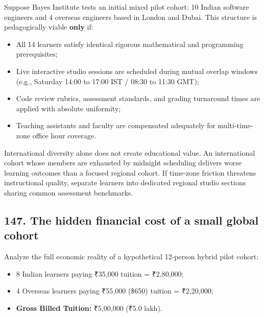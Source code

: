 Suppose Bayes Institute tests an initial mixed pilot cohort: 10 Indian software engineers and 4 overseas engineers based in London and Dubai. This structure is pedagogically viable \textbf{only} if:
\begin{itemize}
    \item All 14 learners satisfy identical rigorous mathematical and programming prerequisites;
    \item Live interactive studio sessions are scheduled during mutual overlap windows (e.g., Saturday 14:00 to 17:00 IST / 08:30 to 11:30 GMT);
    \item Code review rubrics, assessment standards, and grading turnaround times are applied with absolute uniformity;
    \item Teaching assistants and faculty are compensated adequately for multi-time-zone office hour coverage.
\end{itemize}
International diversity alone does not create educational value. An international cohort whose members are exhausted by midnight scheduling delivers worse learning outcomes than a focused regional cohort. If time-zone friction threatens instructional quality, separate learners into dedicated regional studio sections sharing common assessment benchmarks.

\subsection{147. The hidden financial cost of a small global cohort}

Analyze the full economic reality of a hypothetical 12-person hybrid pilot cohort:
\begin{itemize}
    \item 8 Indian learners paying ₹35,000 tuition = ₹2,80,000;
    \item 4 Overseas learners paying ₹55,000 (\$650) tuition = ₹2,20,000;
    \item \textbf{Gross Billed Tuition:} ₹5,00,000 (₹5.0 lakh).
\end{itemize}

